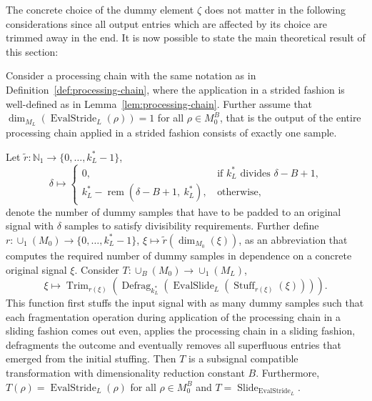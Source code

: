 \documentclass[journal]{IEEEtran}
\newcommand{\N}{\mathbb{N}}
\newcommand{\ROI}{B}
\newcommand{\discint}[2]{\{#1,\dotsc,#2\}}
\DeclareMathOperator{\Slide}{Slide}
\DeclareMathOperator{\Defragmentation}{Defrag}
\DeclareMathOperator{\EvalStride}{EvalStride}
\DeclareMathOperator{\EvalSlide}{EvalSlide}
\DeclareMathOperator{\Stuffing}{Stuff}
\DeclareMathOperator{\Trimming}{Trim}
\newcommand{\rem}[2]{\operatorname{rem}(#1,\ #2)}
\begin{document}
The concrete choice of the dummy element $\zeta$ does not matter in the following considerations since all output entries which are affected by its choice are trimmed away in the end.
It is now possible to state the main theoretical result of this section:
\begin{theorem}
\label{thm:processing-chain}
Consider a processing chain with the same notation as in Definition~\ref{def:processing-chain}, where the application in a strided fashion is well-defined as in Lemma~\ref{lem:processing-chain}.
Further assume that $\dim_{M_L}(\EvalStride_L(\rho)) = 1$ for all $\rho\in M_0^\ROI$, that is the output of the entire processing chain applied in a strided fashion consists of exactly one sample.

Let $\tilde{r}\colon\N_1\to\discint{0}{k_L^* - 1}$, 
\begin{displaymath}
  \delta\mapsto
  \begin{cases}
    0\text{,} & \!\!\!\text{if }k_L^*\text{ divides }\delta - \ROI + 1\text{,}\\
    k_L^* - \rem{\delta - \ROI + 1}{k_L^*}\text{, } & \!\!\!\text{otherwise,}
  \end{cases}
\end{displaymath}
denote the number of dummy samples that have to be padded to an original signal with $\delta$ samples to satisfy divisibility requirements.
Further define $r\colon\cup_1(M_0)\to\discint{0}{k_L^* - 1}$, $\xi\mapsto\tilde{r}(\dim_{M_0}(\xi))$, as an abbreviation that computes the required number of dummy samples in dependence on a concrete original signal $\xi$.
Consider $T\colon\cup_\ROI(M_0)\to\cup_1(M_L)$,
\begin{displaymath}
  \xi\mapsto\Trimming_{r(\xi)}( \Defragmentation_{k_L^*}( \EvalSlide_L( \Stuffing_{r(\xi)}(\xi) ) ) )\text{.}
\end{displaymath}
This function first stuffs the input signal with as many dummy samples such that each fragmentation operation during application of the processing chain in a sliding fashion comes out even, applies the processing chain in a sliding fashion, defragments the outcome and eventually removes all superfluous entries that emerged from the initial stuffing.
Then $T$ is a subsignal compatible transformation with dimensionality reduction constant $\ROI$.
Furthermore, $T(\rho) = \EvalStride_L(\rho)$ for all $\rho\in M_0^\ROI$ and $T = \Slide_{\EvalStride_L}$.
\end{theorem}
\end{document}
